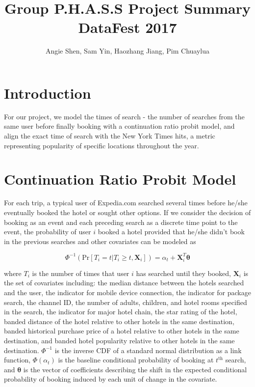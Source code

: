 \documentclass[a4paper]{article}
\title{Group P.H.A.S.S Project Summary \\ DataFest 2017}
\author{Angie Shen, Sam Yin, Haozhang Jiang, Pim Chuaylua}
\begin{document}
\maketitle

\section{Introduction}
For our project, we model the times of search - the number of searches from the same user before finally booking with a continuation ratio probit model, and align the exact time of search with the New York Times hits, a metric representing popularity of specific locations throughout the year.

\section{Continuation Ratio Probit Model}

For each trip, a typical user of Expedia.com searched several times before he/she eventually booked the hotel or sought other options. If we consider the decision of booking as an event and each preceding search as a discrete time point to the event, the probability of user $i$ booked a hotel provided that he/she didn't book in the previous searches and other covariates can be modeled as 

$$\Phi^{-1}(\mbox{Pr}[T_i = t|T_i \geq t, \mathbf{X}_i]) = \alpha_t + \mathbf{X}_{i}^T\bm{\theta}$$

where $T_i$ is the number of times that user $i$ has searched until they booked, $\mathbf{X}_i$ is the set of covariates including: the median distance between the hotels searched and the user, the indicator for mobile device connection, the indicator for package search, the channel ID, the number of adults, children, and hotel rooms specified in the search, the indicator for major hotel chain, the star rating of the hotel, banded distance of the hotel relative to other hotels in the same destination, banded historical purchase price of a hotel relative to other hotels in the same destination, and banded hotel popularity relative to other hotels in the same destination. $\Phi^{-1}$ is the inverse CDF of a standard normal distribution as a link function, $\Phi(\alpha_t)$ is the baseline conditional probability of booking at $t^{\text{th}}$ search, and $\bm{\theta}$ is the vector of coefficients describing the shift in the expected conditional probability of booking induced by each unit of change in the covariate.
\end{document}
